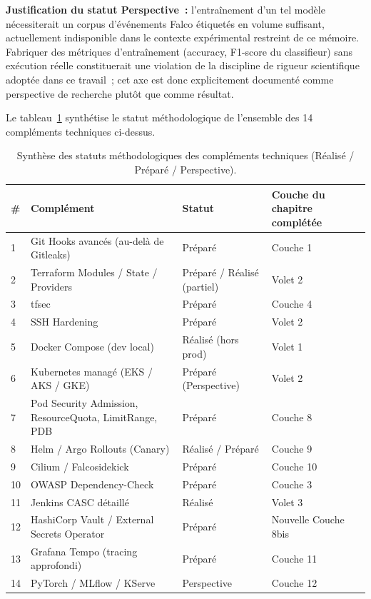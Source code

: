 \textbf{Justification du statut Perspective~:} l'entraînement d'un tel modèle nécessiterait un corpus d'événements Falco étiquetés en volume suffisant, actuellement indisponible dans le contexte expérimental restreint de ce mémoire. Fabriquer des métriques d'entraînement (accuracy, F1-score du classifieur) sans exécution réelle constituerait une violation de la discipline de rigueur scientifique adoptée dans ce travail~; cet axe est donc explicitement documenté comme perspective de recherche plutôt que comme résultat.

\bigskip
Le tableau~\ref{tab:complements_synthese_statuts} synthétise le statut méthodologique de l'ensemble des 14 compléments techniques ci-dessus.

\begin{table}[htbp]
\centering
\scriptsize
\begin{tabular}{@{}p{0.6cm}p{5.5cm}p{2.5cm}p{4cm}@{}}
\toprule
\textbf{\#} & \textbf{Complément} & \textbf{Statut} & \textbf{Couche du chapitre complétée} \\
\midrule
1  & Git Hooks avancés (au-delà de Gitleaks)                       & Préparé    & Couche 1 \\
2  & Terraform Modules / State / Providers                          & Préparé / Réalisé (partiel) & Volet 2 \\
3  & tfsec                                                          & Préparé    & Couche 4 \\
4  & SSH Hardening                                                  & Préparé    & Volet 2 \\
5  & Docker Compose (dev local)                                     & Réalisé (hors prod) & Volet 1 \\
6  & Kubernetes managé (EKS / AKS / GKE)                            & Préparé (Perspective) & Volet 2 \\
7  & Pod Security Admission, ResourceQuota, LimitRange, PDB         & Préparé    & Couche 8 \\
8  & Helm / Argo Rollouts (Canary)                                  & Réalisé / Préparé & Couche 9 \\
9  & Cilium / Falcosidekick                                         & Préparé    & Couche 10 \\
10 & OWASP Dependency-Check                                         & Préparé    & Couche 3 \\
11 & Jenkins CASC détaillé                                          & Réalisé    & Volet 3 \\
12 & HashiCorp Vault / External Secrets Operator                    & Préparé    & Nouvelle Couche 8bis \\
13 & Grafana Tempo (tracing approfondi)                             & Préparé    & Couche 11 \\
14 & PyTorch / MLflow / KServe                                      & Perspective & Couche 12 \\
\bottomrule
\end{tabular}
\caption{Synthèse des statuts méthodologiques des compléments techniques (Réalisé / Préparé / Perspective).}
\label{tab:complements_synthese_statuts}
\end{table}


